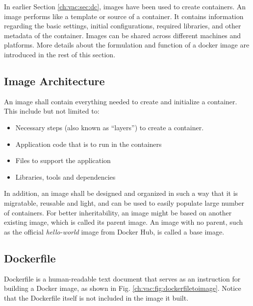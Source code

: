 In earlier Section \ref{ch:vac:sec:dc}, images have been used to create containers. An image performs like a template or source of a container. It contains information regarding the basic settings, initial configurations, required libraries, and other metadata of the container. Images can be shared across different machines and platforms. More details about the formulation and function of a docker image are introduced in the rest of this section.

\subsection{Image Architecture}

An image shall contain everything needed to create and initialize a container. This include but not limited to:
\begin{itemize}
  \item Necessary steps (also known as ``layers'') to create a container.
  \item Application code that is to run in the containers
  \item Files to support the application
  \item Libraries, tools and dependencies
\end{itemize}
In addition, an image shall be designed and organized in such a way that it is migratable, reusable and light, and can be used to easily populate large number of containers. For better inheritability, an image might be based on another existing image, which is called its parent image. An image with no parent, such as the official \textit{hello-world} image from Docker Hub, is called a base image.

\subsection{Dockerfile}

Dockerfile is a human-readable text document that serves as an instruction for building a Docker image, as shown in Fig. \ref{ch:vac:fig:dockerfiletoimage}. Notice that the Dockerfile itself is not included in the image it built.

